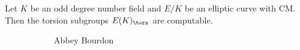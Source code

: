 \begin{frame}[plain]
	\begin{thm}
	Let $K$ be an odd degree number field and $E/K$ be an elliptic curve with CM. Then the torsion subgroups $E(K)_\tors$ are computable. 
	\end{thm} 
	\begin{figure}[h]
	\centering
	\begin{subfigure}{0.3\textwidth}
	\captionsetup{labelformat=empty}
	\centering
	\caption{Abbey Bourdon}
	\end{subfigure}
	\begin{subfigure}{0.3\textwidth}
	\captionsetup{labelformat=empty}
	\centering

\end{subfigure}
\end{figure}
\end{frame}
